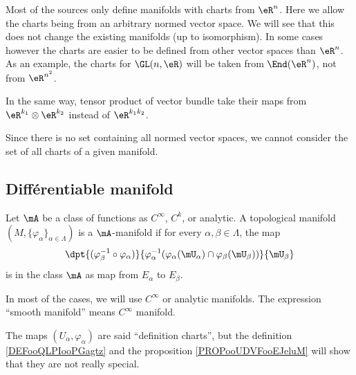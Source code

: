 \begin{normaltext}
	Most of the sources only define manifolds with charts from \( \eR^n\). Here we allow the charts being from an arbitrary normed vector space. We will see that this does not change the existing manifolds (up to isomorphism). In some cases however the charts are easier to be defined from other vector spaces than \( \eR^n\). As an example, the charts for \( \GL(n,\eR)\) will be taken from \( \End(\eR^n)\), not from \( \eR^{n^2}\).

	In the same way, tensor product of vector bundle take their maps from \( \eR^{k_1}\otimes \eR^{k_2}\) instead of \( \eR^{k_1k_2}\).
\end{normaltext}

\begin{normaltext}
	Since there is no set containing all normed vector spaces, we cannot consider the set of all charts of a given manifold.
\end{normaltext}


\subsection{Différentiable manifold}



\begin{definition}		\label{DEFooVMWRooGQYJwl}
	Let \( \mA\) be a class of functions as \(  C^{\infty}\), \( C^k\), or analytic. A topological manifold \( (M,\{ \varphi_{\alpha} \}_{\alpha\in\Lambda})\) is a \( \mA\)-manifold if for every \( \alpha,\beta\in \Lambda\), the map
	\begin{equation}
		\dpt{  (\varphi_{\beta}^{-1}\circ\varphi_{\alpha})  }{   \varphi_{\alpha}^{-1}( \varphi_{\alpha}(\mU_{\alpha})\cap\varphi_{\beta}(\mU_{\beta})  )   }{\mU_{\beta}}
	\end{equation}
	is in the class \( \mA\) as map from \( E_{\alpha}\) to \( E_{\beta}\).

	In most of the cases, we will use \(  C^{\infty}\) or analytic manifolds. The expression ``smooth manifold'' means \(  C^{\infty}\) manifold.

	The maps \( (U_{\alpha}, \varphi_{\alpha})\) are said ``definition charts'', but the definition \ref{DEFooQLPIooPGagtz} and the proposition \ref{PROPooUDVFooEJeluM} will show that they are not really special.
\end{definition}

